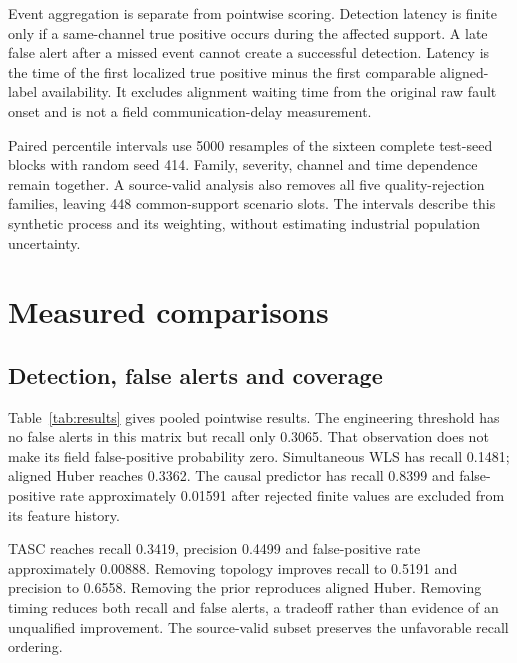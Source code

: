 \documentclass[11pt,a4paper]{article}
\begin{document}
Event aggregation is separate from pointwise scoring. Detection latency is finite only if a same-channel true positive occurs during the affected support. A late false alert after a missed event cannot create a successful detection. Latency is the time of the first localized true positive minus the first comparable aligned-label availability. It excludes alignment waiting time from the original raw fault onset and is not a field communication-delay measurement.

Paired percentile intervals use 5000 resamples of the sixteen complete test-seed blocks with random seed 414. Family, severity, channel and time dependence remain together. A source-valid analysis also removes all five quality-rejection families, leaving 448 common-support scenario slots. The intervals describe this synthetic process and its weighting, without estimating industrial population uncertainty.

\section{Measured comparisons}
\subsection{Detection, false alerts and coverage}
Table~\ref{tab:results} gives pooled pointwise results. The engineering threshold has no false alerts in this matrix but recall only 0.3065. That observation does not make its field false-positive probability zero. Simultaneous WLS has recall 0.1481; aligned Huber reaches 0.3362. The causal predictor has recall 0.8399 and false-positive rate approximately 0.01591 after rejected finite values are excluded from its feature history.

\begin{table}[htbp]\centering\scriptsize
\caption{Full controlled experiment. Ratios use valid finite scores. Coverage is the fraction of the common numerical horizon that receives a score.}\label{tab:results}

\end{table}

TASC reaches recall 0.3419, precision 0.4499 and false-positive rate approximately 0.00888. Removing topology improves recall to 0.5191 and precision to 0.6558. Removing the prior reproduces aligned Huber. Removing timing reduces both recall and false alerts, a tradeoff rather than evidence of an unqualified improvement. The source-valid subset preserves the unfavorable recall ordering.
\end{document}
